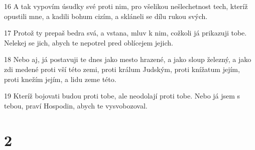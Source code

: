 \par 16 A tak vypovím úsudky své proti nim, pro všelikou nešlechetnost tech, kteríž opustili mne, a kadili bohum cizím, a skláneli se dílu rukou svých.
\par 17 Protož ty prepaš bedra svá, a vstana, mluv k nim, cožkoli já prikazuji tobe. Nelekej se jich, abych te nepotrel pred oblícejem jejich.
\par 18 Nebo aj, já postavuji te dnes jako mesto hrazené, a jako sloup železný, a jako zdi medené proti vší této zemi, proti králum Judským, proti knížatum jejím, proti knežím jejím, a lidu zeme této.
\par 19 Kteríž bojovati budou proti tobe, ale neodolají proti tobe. Nebo já jsem s tebou, praví Hospodin, abych te vysvobozoval.

\chapter{2}

